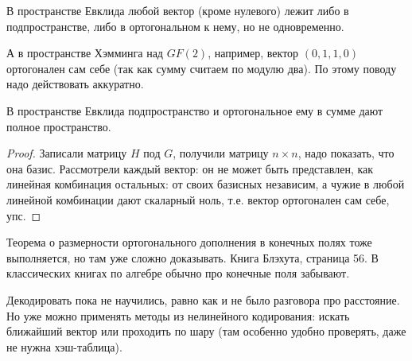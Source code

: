 \begin{Rem}
	В пространстве Евклида любой вектор (кроме нулевого)
	лежит либо в подпространстве,
	либо в ортогональном к нему, но не одновременно.

	А в пространстве Хэмминга над $GF(2)$, например, вектор $(0, 1, 1, 0)$
	ортогонален сам себе (так как сумму считаем по модулю два).
	По этому поводу надо действовать аккуратно.
\end{Rem}
\begin{lemma}
	В пространстве Евклида подпространство и ортогональное ему в сумме
	дают полное пространство.
\end{lemma}
\begin{proof}
	Записали матрицу $H$ под $G$, получили матрицу $n\times n$,
	надо показать, что она базис.
	\TODO
	Рассмотрели каждый вектор: он не может быть представлен, как линейная
	комбинация остальных: от своих базисных независим, а чужие в любой линейной
	комбинации дают скаларный ноль, т.е. вектор ортогонален сам себе, упс.
\end{proof}
\begin{Rem}
	Теорема о размерности ортогонального дополнения в конечных
	полях тоже выполняется, но там уже сложно доказывать.
	Книга Блэхута, страница 56.
	В классических книгах по алгебре обычно про конечные поля забывают.
\end{Rem}

Декодировать пока не научились, равно как и не было разговора про расстояние.
Но уже можно применять методы из нелинейного кодирования: искать ближайший вектор
или проходить по шару (там особенно удобно проверять, даже не нужна хэш-таблица).

